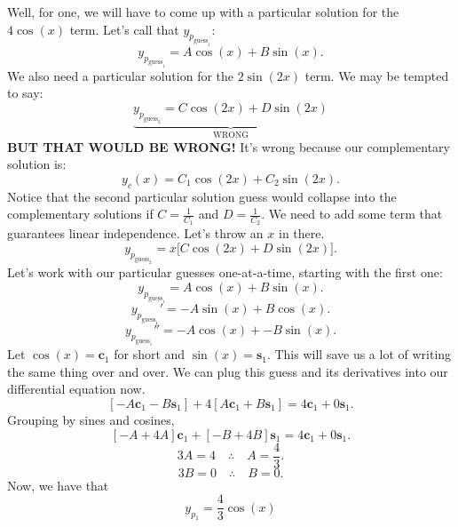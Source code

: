 \documentclass[a4paper,12pt]{article}
\begin{document}
Well, for one, we will have to come up with a particular solution for the $4\cos{(x)}$ term. Let's call that $y_{p_{\text{guess}_1}}$:
$$ y_{p_{\text{guess}_1}} = A\cos{(x)} + B\sin{(x)}.$$
We also need a particular solution for the $2\sin{(2x)}$ term. We may be tempted to say:
$$ \underbrace{y_{p_{\text{guess}_2}} = C\cos{(2x)} + D\sin{(2x)}}_{\text{WRONG}} $$
\textbf{BUT THAT WOULD BE WRONG!} It's wrong because our complementary solution is:
$$ y_{c}(x) = C_1\cos{(2x)} + C_{2}\sin{(2x)}. $$
Notice that the second particular solution guess would collapse into the complementary solutions if $C = \frac{1}{C_1}$ and $D=\frac{1}{C_2}$. We need to add some term that guarantees linear independence. Let's throw an $x$ in there.
$$ y_{p_{\text{guess}_2}} = x\bigg[C\cos{(2x)} + D\sin{(2x)}\bigg]. $$
Let's work with our particular guesses one-at-a-time, starting with the first one:
$$ y_{p_{\text{guess}_1}} = A\cos{(x)} + B\sin{(x)}. $$
$$ y_{p_{\text{guess}_1}}' = -A\sin{(x)} + B\cos{(x)}. $$
$$ y_{p_{\text{guess}_1}}'' = -A\cos{(x)} + -B\sin{(x)}. $$
Let $\cos{(x)} = \textbf{c}_1$ for short and $\sin{(x)} = \textbf{s}_1$. This will save us a lot of writing the same thing over and over. We can plug this guess and its derivatives into our differential equation now.
$$ [-A\textbf{c}_1 - B\textbf{s}_1] + 4[A\textbf{c}_1 + B\textbf{s}_1] = 4\textbf{c}_1 + 0\textbf{s}_1. $$
Grouping by sines and cosines,
$$ [-A + 4A]\textbf{c}_1 + [-B + 4B]\textbf{s}_1 = 4\textbf{c}_1 + 0\textbf{s}_1. $$
$$ 3A = 4 \quad\therefore\quad A = \frac{4}{3}. $$
$$ 3B = 0 \quad\therefore\quad B = 0. $$
Now, we have that
$$ \boxed{y_{p_1} = \frac{4}{3}\cos{(x)}} $$
\pagebreak
\end{document}
